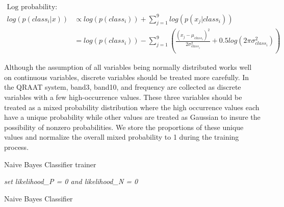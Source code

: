 \documentclass[twoside]{article}
\begin{document}
\begin{align*}
\text{Log probability:}\\
log(p(class_i | x)) &\propto log(p(class_i)) + \sum\limits_{j=1}^{9}  log(p(x_j|class_i)) \\
&= log(p(class_i)) - \sum\limits_{j=1}^{9}  ( \frac{(x_j - \mu_{class_i})^2}{2\sigma_{class_i}^2} + 0.5log(2\pi\sigma_{class_i}^2))
\end{align*}

Although the assumption of all variables being normally distributed works well on continuous variables, discrete variables should be treated more carefully. In the QRAAT system, band3, band10, and frequency are collected as discrete variables with a few high-occurrence values. These three variables should be treated as a mixed probability distribution where the high occurrence values each have a unique probability while other values are treated as Gaussian to insure the possibility of nonzero probabilities. We store the proportions of these unique values and normalize the overall mixed probability to 1 during the training process. 

\IncMargin{1em}
\begin{algorithm}
\BlankLine
{}
\caption{Naive Bayes Classifier trainer}\label{NBCt}
\end{algorithm}\DecMargin{1em}

\IncMargin{1em}
\begin{algorithm}
\BlankLine
\emph{set likelihood\_P = 0 and likelihood\_N = 0}\;
\caption{Naive Bayes Classifier}\label{NBC}
\end{algorithm}\DecMargin{1em}
\end{document}
